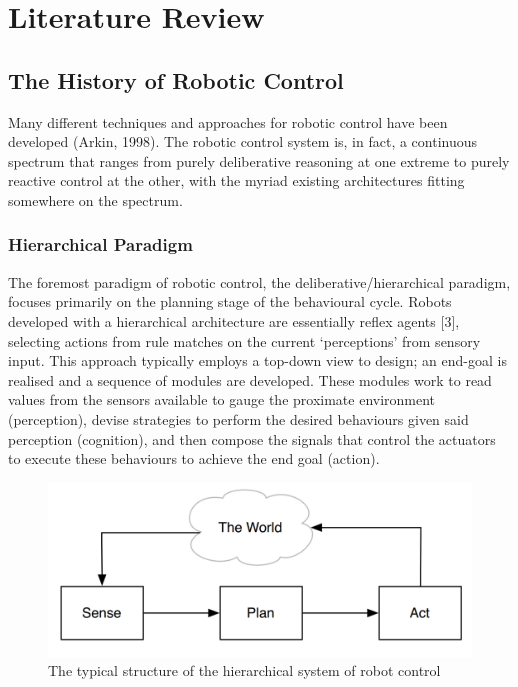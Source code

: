 \documentclass{article}
\begin{document}
    \section{Literature Review}
	\subsection{The History of Robotic Control}
	Many different techniques and approaches for robotic control have been developed (Arkin, 1998). The robotic control system is, in fact, a continuous spectrum that ranges from purely deliberative reasoning at one extreme to purely reactive control at the other, with the myriad existing architectures fitting somewhere on the spectrum.
	

	\subsubsection{Hierarchical Paradigm}
	The foremost paradigm of robotic control, the deliberative/hierarchical paradigm, focuses primarily on the planning stage of the behavioural cycle. Robots developed with a hierarchical architecture are essentially reflex agents [3], selecting actions from rule matches on the current ‘perceptions’ from sensory input. This approach typically employs a top-down view to design; an end-goal is realised and a sequence of modules are developed. These modules work to read values from the sensors available to gauge the proximate environment (perception), devise strategies to perform the desired behaviours given said perception (cognition), and then compose the signals that control the actuators to execute these behaviours to achieve the end goal (action).

	\begin{figure}[h!]
	\centering
	\includegraphics[width=0.8\linewidth]{LiteratureReview2}
	\caption{The typical structure of the hierarchical system of robot control}
	\end{figure}
	
\end{document}
